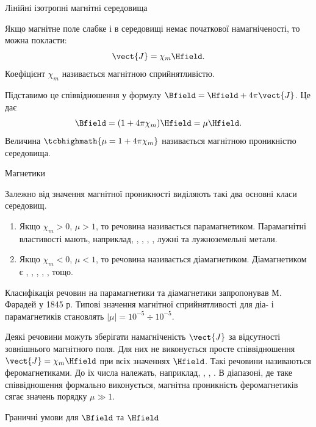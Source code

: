 \documentclass{beamer}
\begin{document}
\begin{frame}{Лінійні ізотропні магнітні середовища}{}
	\begin{block}{}
		Якщо магнітне поле слабке і в середовищі немає початкової намагніченості, то можна покласти:
		\begin{equation*}
			\vect{J} = \chi_m\Hfield.
		\end{equation*}
		Коефіцієнт $ \chi_m$ називається \alert{магнітною сприйнятливістю}.

		Підставимо це співвідношення у формулу $\Bfield = \Hfield + 4\pi\vect{J}$. Це дає
		\begin{equation*}
			\Bfield = (1+4\pi\chi_m)\Hfield = \mu\Hfield.
		\end{equation*}
		Величина $\tcbhighmath{\mu = 1+4\pi\chi_m}$ називається \alert{магнітною проникністю середовища}.
	\end{block}
\end{frame}




\begin{frame}{Магнетики}{}\small
	\begin{block}{}\justifying
		Залежно від значення магнітної проникності виділяють такі два основні класи середовищ.
		\begin{enumerate}
			\item Якщо $\chi_m > 0$, $\mu > 1$, то речовина називається \alert{парамагнетиком}. Парамагнітні властивості мають, наприклад, , ,
			      , , лужні та лужноземельні метали.
			\item Якщо $\chi_m < 0$, $\mu < 1$, то речовина називається \alert{діамагнетиком}. Діамагнетиком є , , , , ,
			       тощо.
		\end{enumerate}
		Класифікація речовин на парамагнетики та діамагнетики запропонував М. Фарадей у 1845 р. Типові значення магнітної сприйнятливості для діа- і
		парамагнетиків становлять $|\mu| = 10^{-5} \div 10^{-5}$.
	\end{block}
	\begin{block}{}\justifying
		Деякі речовини можуть зберігати намагніченість $\vect{J}$ за відсутності зовнішнього магнітного поля. Для них не виконується просте співвідношення
		$\vect{J} = \chi_m\Hfield$ при всіх значеннях $\Hfield$. Такі речовини називаються \alert{феромагнетиками}. До їх числа належать, наприклад, ,
		, . В діапазоні, де таке співвідношення формально виконується, магнітна проникність феромагнетиків сягає значень порядку $\mu
		\gg 1$.
	\end{block}
\end{frame}





\begin{frame}{Граничні умови для $\Bfield$ та $\Hfield$}{}

\end{frame}
\end{document}
